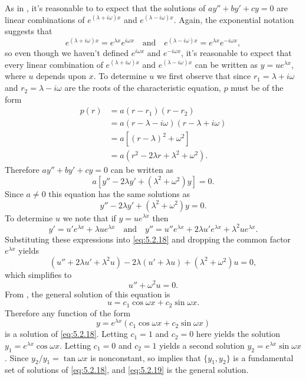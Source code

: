 As in , it's reasonable to
to expect that the solutions of $ay''+by'+cy=0$  are linear
combinations of
$e^{(\lambda+i\omega)x}$ and $e^{(\lambda-i\omega)x}$.
Again,  the exponential notation suggests that
\[
e^{(\lambda+i\omega)x}=e^{\lambda x}e^{i\omega x}
\quad\text{and}\quad
e^{(\lambda-i\omega)x}=e^{\lambda x}e^{-i\omega x},
\]
so even though we haven't defined $e^{i\omega x}$ and
$e^{-i\omega x}$, it's reasonable to expect that every linear
combination of $e^{(\lambda+i\omega)x}$ and $e^{(\lambda-i\omega)x}$
can  be written as
$y=ue^{\lambda x}$, where $u$ depends upon $x$.
To determine $u$ we first observe that since $r_1=\lambda+i\omega$
and $r_2=\lambda-i\omega$ are the roots of the characteristic
equation,  $p$ must be of  the form
\begin{align*}
p(r)
&=a(r-r_1)(r-r_2)\\
&=a(r-\lambda-i\omega)(r-\lambda+i\omega)\\
&= a \left[(r-\lambda)^2+\omega^2\right]\\
&=a(r^2-2\lambda r +\lambda^2+\omega^2).
\end{align*}
Therefore $ay''+by'+cy=0$ can be written as
\[
a\left[y''-2\lambda y'+(\lambda^2+\omega^2)y\right]=0.
\]
 Since $a\ne0$
this equation has the same solutions as
\begin{equation} \label{eq:5.2.18}
y''-2\lambda y'+(\lambda^2+\omega^2)y=0.
\end{equation}
 To determine $u$ we note
that if $y=ue^{\lambda x}$ then
\[
y'=u'e^{\lambda x}+\lambda ue^{\lambda x}\quad\text{and}\quad
y''=u''e^{\lambda x}+2\lambda u'e^{\lambda x}+\lambda^2ue^{\lambda x}.
\]
Substituting these expressions  into
\eqref{eq:5.2.18} and dropping the common factor $e^{\lambda x}$ yields
\[
(u''+2\lambda u'+\lambda^2 u)-2\lambda(u'+\lambda u)
+(\lambda^2+\omega^2)u=0,
\]
which simplifies to
\[
u''+\omega^2 u=0.
\]
From , the  general solution of this
equation is
\[
u=c_1\cos\omega x +c_2\sin\omega x.
\]
 Therefore any function of the form
\begin{equation} \label{eq:5.2.19}
y=e^{\lambda x}(c_1\cos\omega x+c_2\sin\omega x)
\end{equation}
is  a solution of \eqref{eq:5.2.18}.
Letting $c_1=1$ and $c_2=0$ here yields the solution
 $y_1=e^{\lambda x}\cos\omega x$. Letting $c_1=0$ and $c_2=1$
yields a second solution $y_2=e^{\lambda x}\sin\omega x$. Since
$y_2/y_1=\tan\omega x$
is nonconstant, so   implies that
$\{y_1,y_2\}$ is
a fundamental set of solutions of \eqref{eq:5.2.18}, and \eqref{eq:5.2.19}
is the general solution.


